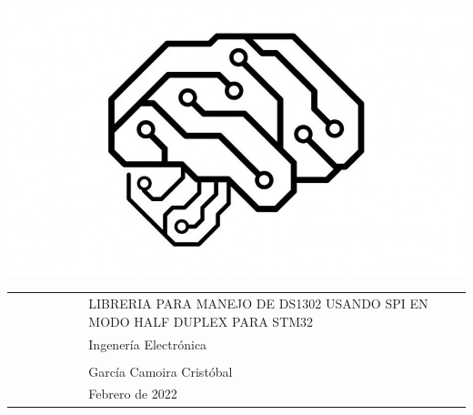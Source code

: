 \documentclass[10pt,a4paper,oneside]{article}
\begin{document}
\pagestyle{empty}

\begin{center} 
\includegraphics[scale=0.4]{Imagenes/PCB_Brain_circuit.png} 
\end{center}

\large

\vspace{3cm}

\begin{center}
{\setlength\arrayrulewidth{2pt}
\begin{tabular}{r|p{9.8cm}}
\arrayrulecolor{udc}
\colorbox{udc}{\textcolor{white}{\bf TÍTULO}}      
&	LIBRERIA PARA MANEJO DE DS1302 USANDO SPI EN MODO HALF DUPLEX PARA STM32  \\[2cm]
\colorbox{udc}{\textcolor{white}{\bf AMBITO}}       & Ingenería Electrónica  \\[1cm]
\colorbox{udc}{\textcolor{white}{ }}  &   \\[2cm]
\colorbox{udc}{\textcolor{white}{\bf AUTOR}}  &	García Camoira Cristóbal  \\[2cm]
\colorbox{udc}{\textcolor{white}{FECHA}}       &	Febrero de 2022
\end{tabular}}
\end{center}
\normalsize
\cleardoublepage
\end{document}
